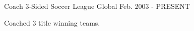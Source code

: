

\begin{cventries}

  \cventry
    {Coach} %
    {3-Sided Soccer League} %
    {Global} %
    {Feb. 2003 - PRESENT} %
    {
      \begin{cvitems} %
        \item {Coached 3 title winning teams.}
      \end{cvitems}
    }

\end{cventries}
